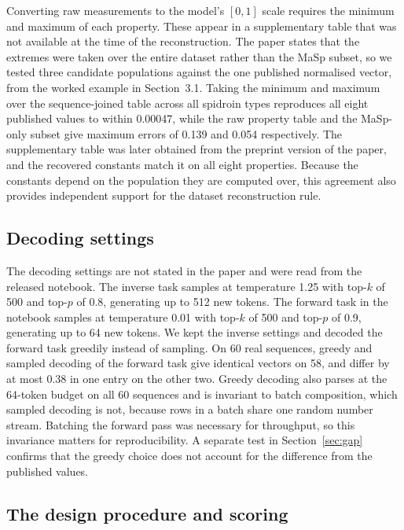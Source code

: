 \documentclass[11pt,a4paper]{article}
\begin{document}
Converting raw measurements to the model's $[0,1]$ scale requires the minimum
and maximum of each property. These appear in a supplementary table that was not
available at the time of the reconstruction. The paper states that the extremes
were taken over the entire dataset rather than the MaSp subset, so we tested
three candidate populations against the one published normalised vector, from
the worked example in Section~3.1. Taking the minimum and maximum over the
sequence-joined table across all spidroin types reproduces all eight published
values to within 0.00047, while the raw property table and the MaSp-only subset
give maximum errors of 0.139 and 0.054 respectively. The supplementary table was
later obtained from the preprint version of the paper, and the recovered
constants match it on all eight properties. Because the constants depend on the
population they are computed over, this agreement also provides independent
support for the dataset reconstruction rule.

\subsection{Decoding settings}
\label{sec:decoding}

The decoding settings are not stated in the paper and were read from the
released notebook. The inverse task samples at temperature 1.25 with top-$k$ of
500 and top-$p$ of 0.8, generating up to 512 new tokens. The forward task in the
notebook samples at temperature 0.01 with top-$k$ of 500 and top-$p$ of 0.9,
generating up to 64 new tokens. We kept the inverse settings and decoded the
forward task greedily instead of sampling. On 60 real sequences, greedy and
sampled decoding of the forward task give identical vectors on 58, and differ by
at most 0.38 in one entry on the other two. Greedy decoding also parses at the
64-token budget on all 60 sequences and is invariant to batch composition, which
sampled decoding is not, because rows in a batch share one random number stream.
Batching the forward pass was necessary for throughput, so this invariance
matters for reproducibility. A separate test in Section~\ref{sec:gap} confirms
that the greedy choice does not account for the difference from the published
values.

\subsection{The design procedure and scoring}
\label{sec:procedure}
\end{document}
